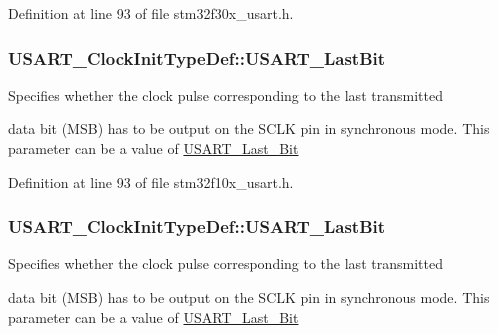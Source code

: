 Definition at line 93 of file stm32f30x\-\_\-usart.\-h.

\hypertarget{struct_u_s_a_r_t___clock_init_type_def_ab1b28d63d2be6e57849666d78a4467bd}{
\subsubsection[{U\-S\-A\-R\-T\-\_\-\-Last\-Bit}]{ U\-S\-A\-R\-T\-\_\-\-Clock\-Init\-Type\-Def\-::\-U\-S\-A\-R\-T\-\_\-\-Last\-Bit}}\label{struct_u_s_a_r_t___clock_init_type_def_ab1b28d63d2be6e57849666d78a4467bd}
\begin{DoxyVerb} Specifies whether the clock pulse corresponding to the last transmitted
\end{DoxyVerb}
 data bit (M\-S\-B) has to be output on the S\-C\-L\-K pin in synchronous mode. This parameter can be a value of \hyperlink{group___u_s_a_r_t___last___bit}{U\-S\-A\-R\-T\-\_\-\-Last\-\_\-\-Bit} 

Definition at line 93 of file stm32f10x\-\_\-usart.\-h.

\hypertarget{struct_u_s_a_r_t___clock_init_type_def_ae26adb8d7ed03618a8d8f8f9cbf3cba6}{
\subsubsection[{U\-S\-A\-R\-T\-\_\-\-Last\-Bit}]{ U\-S\-A\-R\-T\-\_\-\-Clock\-Init\-Type\-Def\-::\-U\-S\-A\-R\-T\-\_\-\-Last\-Bit}}\label{struct_u_s_a_r_t___clock_init_type_def_ae26adb8d7ed03618a8d8f8f9cbf3cba6}
\begin{DoxyVerb}           Specifies whether the clock pulse corresponding to the last transmitted
\end{DoxyVerb}
 data bit (M\-S\-B) has to be output on the S\-C\-L\-K pin in synchronous mode. This parameter can be a value of \hyperlink{group___u_s_a_r_t___last___bit}{U\-S\-A\-R\-T\-\_\-\-Last\-\_\-\-Bit} 


